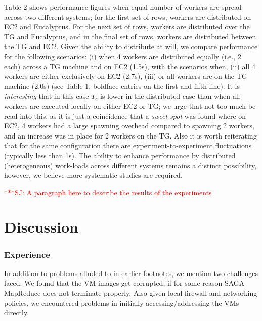 \documentclass[conference,final]{IEEEtran}
\newcommand{\jhanote}[1]{ {\textcolor{red} { ***SJ: #1 }}}
\newcommand{\jhanote}[1]{}
\newcommand{\sagamapreduce }{SAGA-MapReduce }
\begin{document}
Table 2 shows performance figures when equal number of workers are
spread across two different systems; for the first set of rows,
workers are distributed on EC2 and Eucalyptus. For the next set of
rows, workers are distributed over the TG and Eucalyptus, and in the
final set of rows, workers are distributed between the TG and EC2.
Given the ability to distribute at will, we compare performance for
the following scenarios: (i) when 4 workers are distributed equally
(i.e., 2 each) across a TG machine and on EC2 (1.5s), with the
scenarios when, (ii) all 4 workers are either exclusively on EC2
(2.7s), (iii) or all workers are on the TG machine (2.0s) (see Table
1, boldface entries on the first and fifth line). It is {\it
  interesting} that in this case $T_c$ is lower in the distributed
case than when all workers are executed locally on either EC2 or TG;
we urge that not too much be read into this, as it is just a
coincidence that a {\it sweet spot} was found where on EC2, 4 workers
had a large spawning overhead compared to spawning 2 workers, and an
increase was in place for 2 workers on the TG. Also it is worth
reiterating that for the same configuration there are
experiment-to-experiment fluctuations (typically less than 1s).  The
ability to enhance performance by distributed (heterogeneous)
work-loads across different systems remains a distinct possibility,
however, we believe more systematic studies are required.



\jhanote{A paragraph here to describe the results of the experiments}

\section{Discussion}

\subsubsection*{Experience}
In addition to problems alluded to in earlier footnotes, we mention
two challenges  faced. We found that the VM images get corrupted, if for
some reason \sagamapreduce does not terminate properly. Also given
local firewall and networking policies, we encountered problems in
initially accessing/addressing the VMs directly.
\end{document}
